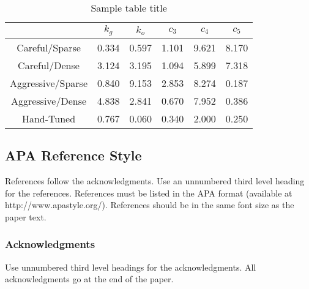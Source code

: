 \documentclass{article}
\begin{document}
\begin{table}[t]
\caption{Sample table title} \label{sample-table}
\begin{center}
\begin{tabular}{|c|c|c|c|c|c|}
  \hline
   & $k_{g}$ & $k_{o}$ & $c_{3}$ & $c_{4}$ & $c_{5}$ \\
  \hline\hline
  Careful/Sparse & 0.334 & 0.597 & 1.101 & 9.621 & 8.170 \\ \hline
  Careful/Dense & 3.124 & 3.195 & 1.094 & 5.899 & 7.318 \\ \hline
  Aggressive/Sparse & 0.840 & 9.153 & 2.853 & 8.274 & 0.187 \\ \hline
  Aggressive/Dense & 4.838 & 2.841 & 0.670 & 7.952 & 0.386 \\ \hline
  Hand-Tuned & 0.767 & 0.060 & 0.340 & 2.000 & 0.250 \\
  \hline
\end{tabular}
\end{center}
\end{table}

\subsection{APA Reference Style}

References follow the acknowledgments. Use an unnumbered third level
heading for the references. References must be listed in the APA
format (available at http://www.apastyle.org/). References should be
in the same font size as the paper text.

\subsubsection*{Acknowledgments}
Use unnumbered third level headings for the acknowledgments. All
acknowledgments go at the end of the paper.



\end{document}
